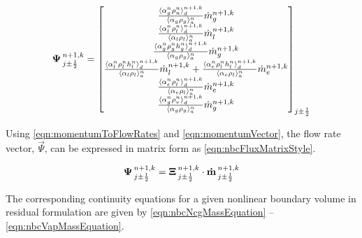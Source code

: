 \begin{equation}
\label{eqn:nbcFluxDefinition}
\vec{\Psi}^{n+1, k}_{j \pm \onehalf} = \begin{bmatrix}
\frac{\don{\alpha^{n}_{g} \rho^{n}_{n}}^{n+1,k}_{d}}{\ave{\alpha_{g} \rho_{g}}^{n}_{a}}\dot{m}^{n+1,k}_{g} \\
%
\frac{\don{\alpha^{n}_{l}\rho^{n}_{l}}^{n+1,k}_{d}}{\ave{\alpha_{l} \rho_{l}}^{n}_{a}}\dot{m}^{n+1,k}_{l}\\
%
\frac{\don{\alpha^{n}_{g} \rho^{n}_{g} h^{n}_{g}}^{n+1,k}_{d}}{\ave{\alpha_{g} \rho_{g}}^{n}_{a}}\dot{m}^{n+1, k}_{g}\\
%
\frac{\don{\alpha^{n}_{l}\rho^{n}_{l} h^{n}_{l}}^{n+1,k}_{d}}{\ave{\alpha_{l} \rho_{l}}^{n}_{a}}\dot{m}^{n+1, k}_{l} +\frac{\don{\alpha^{n}_{e} \rho^{n}_{l} h^{n}_{l}}^{n+1, k}_{d}}{\ave{\alpha_{e} \rho_{l}}^{n}_{a}}\dot{m}^{n+1, k}_{e} \\
%
\frac{ \don{\alpha^{n}_{e} \rho^{n}_{l}}^{n+1, k}_{d}}{ \ave{\alpha_{e} \rho_{l}}^{n}_{a}} \dot{m}^{n+1, k}_{e} \\
%
\frac{ \don{\alpha^{n}_{g} \rho^{n}_{v}}^{n+1, k}_{d}}{ \ave{\alpha_{g} \rho_{g}}^{n}_{a}} \dot{m}^{n+1, k}_{g}
\end{bmatrix}_{j \pm \onehalf}
\end{equation}

Using \eqref{eqn:momentumToFlowRates} and \eqref{eqn:momentumVector}, the flow rate vector, $\vec{\Psi}$, can be expressed in matrix form as \eqref{eqn:nbcFluxMatrixStyle}.

\begin{equation}
\label{eqn:nbcFluxMatrixStyle}
\vec{\Psi}^{n+1, k}_{j \pm \onehalf} = \vec{\Xi}^{n+1, k}_{j \pm \onehalf} \cdot \vec{\dot{m}}^{n+1, k}_{j \pm \onehalf}
\end{equation}

The corresponding continuity equations for a given nonlinear boundary volume in residual formulation are given by \eqref{eqn:nbcNcgMassEquation} -- \eqref{eqn:nbcVapMassEquation}.

